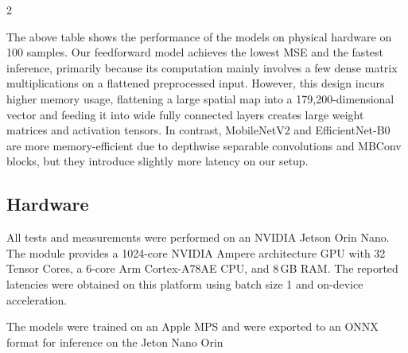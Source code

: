 \documentclass[a4paper]{article}
\begin{document}
\begin{multicols}{2}
\par \noindent
The above table shows the performance of the models on physical hardware on 100 samples. Our feedforward model achieves the lowest MSE and the fastest inference, primarily because its computation mainly involves a few dense matrix multiplications on a flattened preprocessed input. However, this design incurs higher memory usage, flattening a large spatial map into a 179{,}200-dimensional vector and feeding it into wide fully connected layers creates large weight matrices and activation tensors. In contrast, MobileNetV2 and EfficientNet-B0 are more memory-efficient due to depthwise separable convolutions and MBConv blocks, but they introduce slightly more latency on our setup.

\par \noindent

\subsection{Hardware}
\par \noindent
All tests and measurements were performed on an NVIDIA Jetson Orin Nano. The module provides a 1024-core NVIDIA Ampere architecture GPU with 32 Tensor Cores, a 6-core Arm Cortex-A78AE CPU, and 8\,GB RAM. The reported latencies were obtained on this platform using batch size 1 and on-device acceleration.

\par \noindent
The models were trained on an Apple MPS and were exported to an ONNX format for inference on the Jeton Nano Orin


\end{multicols}
\end{document}
